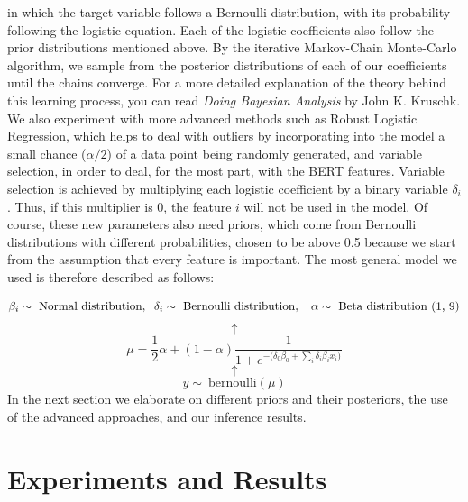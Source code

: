 \documentclass[man, floatsintext, 10pt]{apa6}
\begin{document}
in which the target variable follows a Bernoulli distribution, with its probability following the logistic equation. Each of the logistic coefficients also follow the prior distributions mentioned above. By the iterative Markov-Chain Monte-Carlo algorithm, we sample from the posterior distributions of each of our coefficients until the chains converge. For a more detailed explanation of the theory behind this learning process, you can read \textit{Doing Bayesian Analysis} by John K. Kruschk. We also experiment with more advanced methods such as Robust Logistic Regression, which helps to deal with outliers by incorporating into the model a small chance ($\alpha/2$) of a data point being randomly generated, and variable selection, in order to deal, for the most part, with the BERT features. Variable selection is achieved by multiplying each logistic coefficient by a binary variable $\delta_i$. Thus, if this multiplier is 0, the feature $i$ will not be used in the model. Of course, these new parameters also need priors, which come from Bernoulli distributions with different probabilities, chosen to be above 0.5 because we start from the assumption that every feature is important. The most general model we used is therefore described as follows:

\[\beta_i \sim \text{ Normal distribution}, \hspace{2mm} \delta_i \sim \text{ Bernoulli distribution}, \hspace{2mm}\ \alpha \sim \text{ Beta distribution (1, 9)} \] \[ \uparrow \] \[ \mu = \frac{1}{2} \alpha + (1 - \alpha) \frac{1}{1 + e^{-\big(\delta_0 \beta_0 + \sum_i \delta_i \beta_i x_i \big)}} \] \vspace{0.01mm} \[ \uparrow \] \[ y \sim\ \text{bernoulli} (\mu) \]
In the next section we elaborate on different priors and their posteriors, the use of the advanced approaches, and our inference results.

\section{Experiments and Results}
\end{document}
